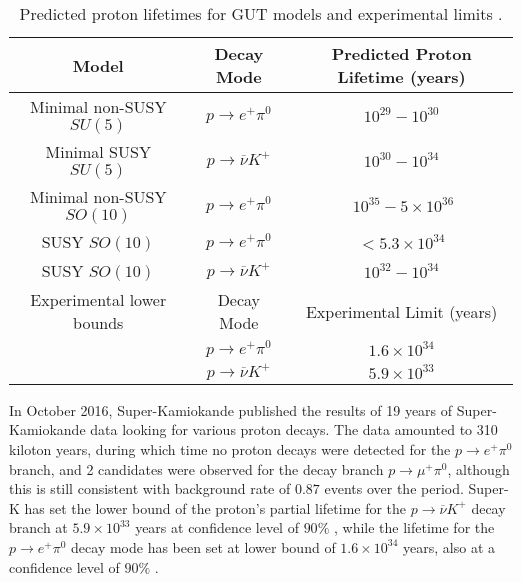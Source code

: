 \documentclass{article}
\begin{document}
\begin{table}[h!t]
\label{table:protonDecay}
\centering
\caption{Predicted proton lifetimes for GUT models and experimental limits \cite{HyperK}.}
\begin{tabular}{ |c|c|c| } 
\hline	
Model & Decay Mode & Predicted Proton Lifetime (years)\\
\hline
Minimal non-SUSY $SU(5)$ & $p\rightarrow e^{+} \pi^{0}$ & $10^{29}-10^{30}$ \cite{PDMinimalSU5}\\ 
Minimal SUSY $SU(5)$ & $p\rightarrow \overline{\nu}K^+$ & $10^{30}-10^{34}$ \cite{PDMinimalSUSYSU5}\cite{SUSYSU5Decay}\\
Minimal non-SUSY $SO(10)$ & $p\rightarrow e^{+} \pi^{0}$ & $~10^{35}-5\times10^{36}$ \cite{SO10_1}\cite{SO10_2}\\ 
SUSY $SO(10)$ & $p\rightarrow e^{+} \pi^{0}$ & $<5.3\times 10^{34}$ \cite{SUSYSO10}\\
SUSY $SO(10)$ & $p\rightarrow \overline{\nu}K^+$ & $10^{32}-10^{34}$ \cite{PDSUSYSO10_1}\\
\hline
Experimental lower bounds & Decay Mode & Experimental Limit (years)\\
\hline
 & $p\rightarrow e^+ \pi^0$ & $1.6\times10^{34}$ \cite{SuperK2016} \\
 & $p\rightarrow \overline{\nu}K^+$ & $5.9\times10^{33}$\cite{SuperK2014} \\
 \hline
\end{tabular}
\end{table}

In October 2016, Super-Kamiokande published the results of 19 years of Super-Kamiokande data looking for various proton decays. The data amounted to 310 kiloton years,  during which time no proton decays were detected for the $p\rightarrow e^+ \pi^0$ branch, and 2 candidates were observed for the decay branch $p\rightarrow \mu^+ \pi^0$, although this is still consistent with background rate of $0.87$ events over the period\cite{SuperK2016}. Super-K has set the lower bound of the proton's partial lifetime for the $p\rightarrow \overline{\nu}K^+$ decay branch at $5.9\times10^{33}$ years at confidence level of $90\%$ \cite{SuperK2014}, while the lifetime for the $p\rightarrow e^+ \pi^0$ decay mode has been set at lower bound of $1.6\times10^{34}$ years, also at a confidence level of $90\%$ \cite{SuperK2016}. 
\end{document}
